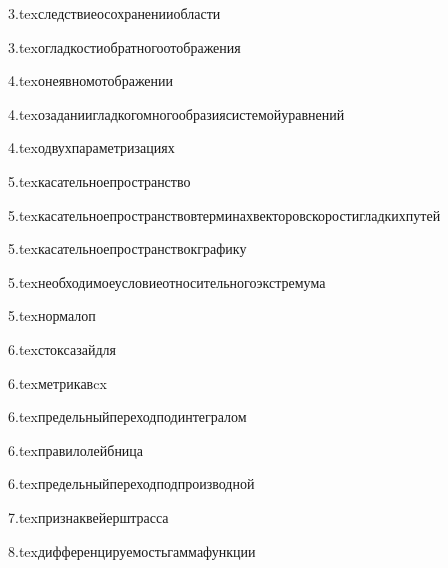 {3.tex}{следствиеосохраненииобласти}

{3.tex}{огладкостиобратногоотображения}

{4.tex}{онеявномотображении}

{4.tex}{озаданиигладкогомногообразиясистемойуравнений}

{4.tex}{одвухпараметризациях}

{5.tex}{касательноепространство}

{5.tex}{касательноепространствовтерминахвекторовскоростигладкихпутей}

{5.tex}{касательноепространствокграфику}

{5.tex}{необходимоеусловиеотносительногоэкстремума}

{5.tex}{нормалоп}

{6.tex}{стоксазайдля}

{6.tex}{метрикавcx}

{6.tex}{предельныйпереходподинтегралом}

{6.tex}{правилолейбница}

{6.tex}{предельныйпереходподпроизводной}

{7.tex}{признаквейерштрасса}

{8.tex}{дифференцируемостьгаммафункции}


